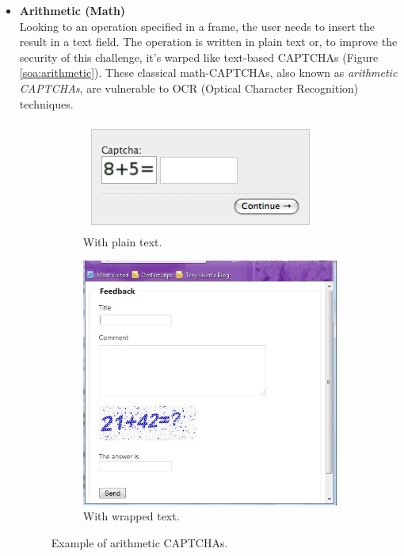 \begin{itemize}
\item{\textbf{Arithmetic (Math)}\\
Looking to an operation specified in a frame, the user needs to insert the result in a text field. The operation is written in plain text or, to improve the security of this challenge, it's warped like text-based CAPTCHAs (Figure \ref{soa:arithmetic}). These classical math-CAPTCHAs, also known as \textit{arithmetic CAPTCHAs}, are vulnerable to OCR (Optical Character Recognition) techniques.\\
\begin{figure}[h]
     \centering
     \begin{subfigure}[b]{0.48\textwidth}
         \centering
         \includegraphics[width=.7\linewidth]{Images/StateOfArt/math_CAPTCHA}
         \caption{\footnotesize{With plain text.}}
     \end{subfigure}
     \hfill
     \begin{subfigure}[b]{0.48\textwidth}
         \centering
         \includegraphics[width=.7\textwidth]{Images/StateOfArt/math_CAPTCHA2}
         \caption{\footnotesize{With wrapped text.}}
     \end{subfigure}
		\caption{\footnotesize{Example of arithmetic CAPTCHAs.}}

\end{figure}}
\end{itemize}
